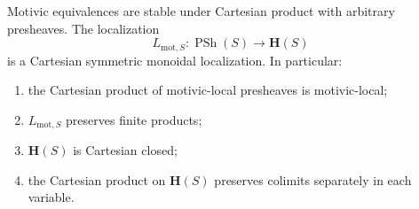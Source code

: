 \begin{theorem}
\label{thm:cartesian-monoidal-motivic-localization}
Motivic equivalences are stable under Cartesian product with arbitrary
presheaves.  The localization
\[
    L_{\mathrm{mot},S}
    \colon
    \operatorname{PSh}(S)
    \longrightarrow
    \mathbf H(S)
\]
is a Cartesian symmetric monoidal localization.  In particular:
\begin{enumerate}[label=(\roman*)]
    \item the Cartesian product of motivic-local presheaves is
    motivic-local;

    \item \(L_{\mathrm{mot},S}\) preserves finite products;

    \item \(\mathbf H(S)\) is Cartesian closed;

    \item the Cartesian product on \(\mathbf H(S)\) preserves colimits
    separately in each variable.
\end{enumerate}
\end{theorem}

